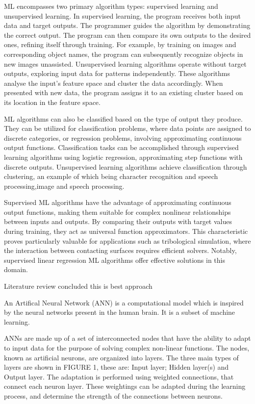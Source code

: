 ML encompasses two primary algorithm types: supervised learning and unsupervised learning. In supervised learning, the program receives both input data and target outputs. The programmer guides the algorithm by demonstrating the correct output. The program can then compare its own outputs to the desired ones, refining itself through training. For example, by training on images and corresponding object names, the program can subsequently recognize objects in new images unassisted. Unsupervised learning algorithms operate without target outputs, exploring input data for patterns independently. These algorithms analyse the input's feature space and cluster the data accordingly. When presented with new data, the program assigns it to an existing cluster based on its location in the feature space.

ML algorithms can also be classified based on the type of output they produce. They can be utilized for classification problems, where data points are assigned to discrete categories, or regression problems, involving approximating continuous output functions. Classification tasks can be accomplished through supervised learning algorithms using logistic regression, approximating step functions with discrete outputs. Unsupervised learning algorithms achieve classification through clustering, an example of which being character recognition and speech processing,image and speech processing.

Supervised ML algorithms have the advantage of approximating continuous output functions, making them suitable for complex nonlinear relationships between inputs and outputs. By comparing their outputs with target values during training, they act as universal function approximators. This characteristic proves particularly valuable for applications such as tribological simulation, where the interaction between contacting surfaces requires efficient solvers. Notably, supervised linear regression ML algorithms offer effective solutions in this domain.

Literature review concluded this is best approach

An Artifical Neural Network (ANN) is a computational model which is inspired by the neural networks present in the human brain. It is a subset of machine learning.

ANNs are made up of a set of interconnected nodes that have the ability to adapt to input data for the purpose of solving complex non-linear functions. The nodes, known as artificial neurons, are organized into layers. The three main types of layers are shown in FIGURE 1, these are: Input layer; Hidden layer(s) and Output layer. The adaptation is performed using weighted connections, that connect each neuron layer. These weightings can be adapted during the learning process, and determine the strength of the connections between neurons.

